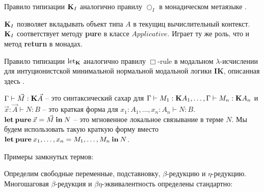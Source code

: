 Правило типизации ${\bf K}_I$ аналогично правилу $\bigcirc_I$ в монадическом метаязыке \cite{Lax}.

${\bf K}_I$ позволяет вкладывать объект типа $A$ в текущиц вычислительный контекст. ${\bf K}_I$ соответствует методу {\bf pure} в классе $Applicative$.
Играет ту же роль, что и метод {\bf return} в монадах.

Правило типизации $\text{let}_{{\bf K}}$ аналогично правилу $\Box$-rule в модальном $\lambda$-исчислении для интуционистской минимальной нормальной модальной логики {\bf IK}, описанная здесь \cite{ModalK}.

$\Gamma \vdash \vec{M} : {\bf K} \vec{A}$ -- это синтаксический сахар для $\Gamma \vdash M_1 : {\bf K}A_1,\dots,\Gamma \vdash M_n : {\bf K}A_n$ и $\vec{x} : \vec{A} \vdash N : B$ -- это краткая форма для $x_1 : A_1, \dots, x_n : A_n \vdash N : B$.
${\bf let \: pure \:} \vec{x} = \vec{M} {\: \bf in \: } N$ -- это мгновенное локальное связывание в терме $N$.
Мы будем использовать такую краткую форму вместо ${\bf let \: pure\:} x_1,\dots,x_n = M_1,\dots,M_n {\: \bf in \:} N$.

\vspace{\baselineskip}

Примеры замкнутых термов:

\begin{prooftree}
\end{prooftree}

\begin{prooftree}
\end{prooftree}

\vspace{\baselineskip}

Определим свободные переменные, подставновку, $\beta$-редукцию и $\eta$-редукцию. Многошаговая $\beta$-редукция и $\beta \eta$-эквивалентность определены стандартно:


